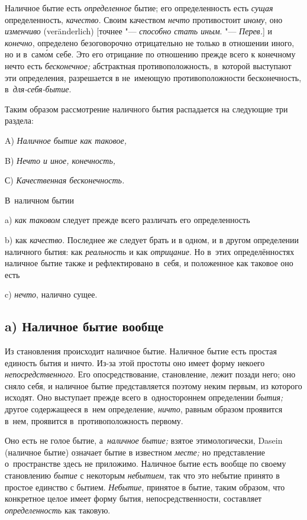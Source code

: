 Наличное бытие есть {\em определенное} бытие; его определенность есть
{\em сущая} определенность, {\em качество}. Своим качеством {\em нечто}
противостоит {\em иному}, оно {\em изменчиво} (ver\-änder\-lich)
[точнее "--- {\em способно стать иным}. "--- {\em Перев.}] и {\em конечно},
определено безоговорочно отрицательно не только в отношении иного, но и
в~сам\'{о}м себе. Это его отрицание по отношению прежде всего к конечному нечто
есть {\em бесконечное;} абстрактная противоположность, в~которой выступают эти
определения, разрешается в не~имеющую противоположности бесконечность,
в~{\em для-себя-бытие}.

Таким образом рассмотрение наличного бытия
распадается на следующие три раздела:

A) {\em Наличное бытие как таковое,}

B) {\em Нечто и иное, конечность,}

С) {\em Качественная бесконечность.}


В~наличном бытии

a) {\em как таковом} следует прежде всего различать его определенность

b) как {\em качество}. Последнее же следует брать и в одном, и в другом
определении наличного бытия: как {\em реальность} и как {\em отрицание}.
Но в~этих определённостях наличное бытие также и рефлектировано в~себя,
и положенное как таковое оно есть

c) {\em нечто}, налично сущее.

\subsection[a) Наличное бытие вообще]{a) Наличное бытие вообще}

Из становления происходит наличное бытие. Наличное бытие есть простая единость
бытия и ничто. Из-за этой простоты оно имеет форму некоего
{\em непосредственного}. Его опосредствование, становление, лежит позади него;
оно сняло себя, и наличное бытие представляется поэтому неким первым, из
которого исходят. Оно выступает прежде всего в~одностороннем определении
{\em бытия;} другое содержащееся в~нем определение, {\em ничто}, равным
образом проявится в~нем, проявится в~противоположность первому.

Оно есть не голое бытие, а~{\em наличное бытие;} взятое этимологически, Dasein
(наличное бытие) означает бытие в известном {\em месте;} но представление
о~пространстве здесь не приложимо. Наличное бытие есть вообще по своему
становлению {\em бытие} с некоторым {\em небытием}, так что это небытие принято
в простое единство с бытием. {\em Небытие}, принятое в бытие, таким образом,
что конкретное целое имеет форму бытия, непосредственности, составляет
{\em определенность} как таковую.

